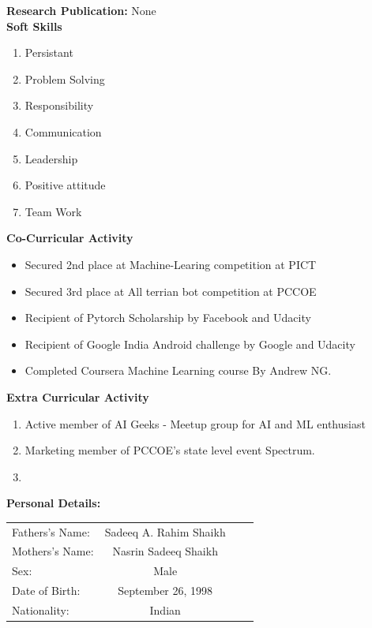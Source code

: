 \documentclass[10pt,twoside,a4paper]{article}
\begin{document}
\noindent
\textbf{Research Publication:}
None\\

\newpage
\noindent
\textbf{Soft Skills}
\begin{enumerate}
\item Persistant
\item Problem Solving
\item Responsibility
\item Communication
\item Leadership
\item Positive attitude
\item Team Work 
\\
\end{enumerate}

\noindent
\textbf{Co-Curricular Activity}
\begin{itemize}
\item Secured 2nd place at Machine-Learing competition at PICT
\item Secured 3rd place at All terrian bot competition at PCCOE 
\item Recipient of Pytorch Scholarship by Facebook and Udacity
\item Recipient of Google India Android challenge by Google and Udacity
\item Completed Coursera Machine Learning course By Andrew NG.
\end{itemize}


\noindent
\textbf{Extra Curricular Activity}
\begin{enumerate}
\item Active member of AI Geeks - Meetup group for AI and ML enthusiast
\item Marketing member of PCCOE's state level event Spectrum.
\item 
\end{enumerate}

\noindent
\textbf{Personal Details:}
\begin{flushleft}
\begin{tabular}{l c c l}
Fathers\rq{}s Name: & Sadeeq A. Rahim Shaikh\\
Mothers\rq{}s Name:& Nasrin Sadeeq Shaikh\\
Sex:&Male\\
Date of Birth:& September 26, 1998 \\
Nationality:& Indian\\
\end{tabular}
\end{flushleft}
\end{document}
